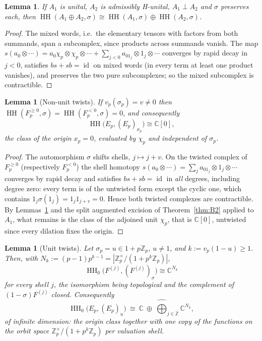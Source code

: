 \documentclass[11pt]{amsart}
\newtheorem{lemma}[theorem]{Lemma}
\theoremstyle{definition}
\theoremstyle{remark}
\newcommand{\C}{\mathbb C}
\newcommand{\Z}{\mathbb Z}
\newcommand{\id}{\operatorname{id}}
\newcommand{\HH}{\operatorname{HH}}
\begin{document}
\begin{lemma}\label{lem:orthsum}
If $A_1$ is unital, $A_2$ is admissibly H-unital, $A_1\perp A_2$ and $\sigma$
preserves each, then
$\HH(A_1\oplus A_2,\sigma)\cong\HH(A_1,\sigma)\oplus\HH(A_2,\sigma)$.
\end{lemma}

\begin{proof}
The mixed words, i.e.\ the elementary tensors with factors from both summands,
span a subcomplex, since products across summands vanish.  The map
$s(a_0\otimes\cdots)=a_0\chi_p\otimes\chi_p\otimes\cdots+
\sum_{j<0}a_01_j\otimes1_j\otimes\cdots$ converges by rapid decay in $j<0$,
satisfies $bs+sb=\id$ on mixed words (in every term at least one product
vanishes), and preserves the two pure subcomplexes; so the mixed subcomplex is
contractible.
\end{proof}

\begin{lemma}[Non-unit twists]\label{lem:nonunit}
If $v_p(\sigma_p)=v\ne0$ then $\HH(F_p^{\ge0},\sigma)=\HH(F_p^{<0},\sigma)=0$,
and consequently
\begin{equation}\label{eq:D1}
\HH\bigl(E_p,(E_p)_{\sigma_p}\bigr)\cong\C[0],
\end{equation}
the class of the origin $x_p=0$, evaluated by $\chi_p$ and independent of
$\sigma_p$.
\end{lemma}

\begin{proof}
The automorphism $\sigma$ shifts shells, $j\mapsto j+v$.  On the twisted
complex of $F_p^{\ge0}$ (respectively $F_p^{<0}$) the shell homotopy
$s(a_0\otimes\cdots)=\sum_ja_01_j\otimes1_j\otimes\cdots$ converges by rapid
decay and satisfies $bs+sb=\id$ in \emph{all} degrees, including degree zero:
every term is of the untwisted form except the cyclic one, which contains
$1_j\sigma(1_j)=1_j1_{j+v}=0$.  Hence both twisted complexes are contractible.
By Lemmas~\ref{lem:orthsum} and the split augmented excision of
Theorem~\ref{thm:B2} applied to $A_1$, what remains is the class of the
adjoined unit $\chi_p$, that is $\C[0]$, untwisted since every dilation fixes
the origin.
\end{proof}

\begin{lemma}[Unit twists]\label{lem:unit}
Let $\sigma_p=u\in1+p\Z_p$, $u\ne1$, and $k:=v_p(1-u)\ge1$.  Then, with
$N_k:=(p-1)p^{k-1}=|\Z_p^{\times}/(1+p^{k}\Z_p)|$,
\[
\HH_0\bigl(F^{(j)},(F^{(j)})_{\sigma}\bigr)\cong\C^{N_k}
\]
for every shell $j$, the isomorphism being topological and the complement of
$(1-\sigma)F^{(j)}$ closed.  Consequently
\begin{equation}\label{eq:D2}
\HH_0\bigl(E_p,(E_p)_{u}\bigr)\ \cong\ \C\ \oplus\
\widehat\bigoplus_{j\in\Z}\C^{N_k},
\end{equation}
of infinite dimension: the origin class together with one copy of the
functions on the orbit space $\Z_p^{\times}/(1+p^{k}\Z_p)$ per valuation shell.
\end{lemma}
\end{document}
